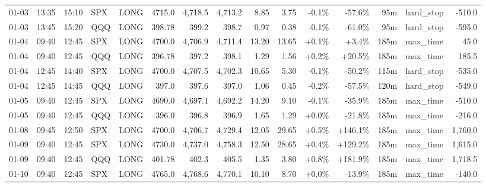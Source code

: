 \documentclass[11pt,a4paper,twoside]{article}
\begin{document}
\begin{landscape}
\begin{center}
\begin{longtable}{>{\color{txtmain}}l l l l l r r r r r r r r >{\color{txtmain}}l r}
01-03 & 13:35 & 15:10 & SPX & LONG & 4715.0 & 4,718.5 & 4,713.2 & 8.85 & 3.75 & \textcolor{lossred}{-0.1\%} & \textcolor{lossred}{-57.6\%} & 95m & hard\_stop & \textcolor{lossred}{-510.0} \\
01-03 & 13:45 & 15:20 & QQQ & LONG & 398.78 & 399.2 & 398.7 & 0.97 & 0.38 & \textcolor{lossred}{-0.1\%} & \textcolor{lossred}{-61.0\%} & 95m & hard\_stop & \textcolor{lossred}{-595.0} \\
01-04 & 09:40 & 12:45 & SPX & LONG & 4700.0 & 4,706.9 & 4,711.4 & 13.20 & 13.65 & \textcolor{wingreen}{+0.1\%} & \textcolor{wingreen}{+3.4\%} & 185m & max\_time & \textcolor{wingreen}{45.0} \\
01-04 & 09:40 & 12:45 & QQQ & LONG & 396.78 & 397.2 & 398.1 & 1.29 & 1.56 & \textcolor{wingreen}{+0.2\%} & \textcolor{wingreen}{+20.5\%} & 185m & max\_time & \textcolor{wingreen}{185.5} \\
01-04 & 12:45 & 14:40 & SPX & LONG & 4700.0 & 4,707.5 & 4,702.3 & 10.65 & 5.30 & \textcolor{lossred}{-0.1\%} & \textcolor{lossred}{-50.2\%} & 115m & hard\_stop & \textcolor{lossred}{-535.0} \\
01-04 & 12:45 & 14:45 & QQQ & LONG & 397.0 & 397.6 & 397.0 & 1.06 & 0.45 & \textcolor{lossred}{-0.2\%} & \textcolor{lossred}{-57.5\%} & 120m & hard\_stop & \textcolor{lossred}{-549.0} \\
01-05 & 09:40 & 12:45 & SPX & LONG & 4690.0 & 4,697.1 & 4,692.2 & 14.20 & 9.10 & \textcolor{lossred}{-0.1\%} & \textcolor{lossred}{-35.9\%} & 185m & max\_time & \textcolor{lossred}{-510.0} \\
01-05 & 09:40 & 12:45 & QQQ & LONG & 396.0 & 396.8 & 396.9 & 1.65 & 1.29 & \textcolor{wingreen}{+0.0\%} & \textcolor{lossred}{-21.8\%} & 185m & max\_time & \textcolor{lossred}{-216.0} \\
01-08 & 09:45 & 12:50 & SPX & LONG & 4700.0 & 4,706.7 & 4,729.4 & 12.05 & 29.65 & \textcolor{wingreen}{+0.5\%} & \textcolor{wingreen}{+146.1\%} & 185m & max\_time & \textcolor{wingreen}{1,760.0} \\
01-09 & 09:40 & 12:45 & SPX & LONG & 4730.0 & 4,737.0 & 4,758.3 & 12.50 & 28.65 & \textcolor{wingreen}{+0.4\%} & \textcolor{wingreen}{+129.2\%} & 185m & max\_time & \textcolor{wingreen}{1,615.0} \\
01-09 & 09:40 & 12:45 & QQQ & LONG & 401.78 & 402.3 & 405.5 & 1.35 & 3.80 & \textcolor{wingreen}{+0.8\%} & \textcolor{wingreen}{+181.9\%} & 185m & max\_time & \textcolor{wingreen}{1,718.5} \\
01-10 & 09:40 & 12:45 & SPX & LONG & 4765.0 & 4,768.6 & 4,770.1 & 10.10 & 8.70 & \textcolor{wingreen}{+0.0\%} & \textcolor{lossred}{-13.9\%} & 185m & max\_time & \textcolor{lossred}{-140.0} \\

\end{longtable}
\end{center}
\end{landscape}
\end{document}
